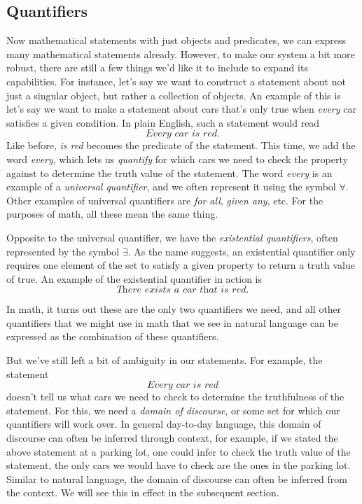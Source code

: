 \subsection{Quantifiers}
Now mathematical statements with just objects and predicates, we can express many mathematical statements already.
However, to make our system a bit more robust, there are still a few things we'd like it to include to expand its capabilities.
For instance, let's say we want to construct a statement about not just a singular object, but rather a collection of objects.
An example of this is let's say we want to make a statement about cars that's only true when \textit{every} car satisfies a given condition.
In plain English, such a statement would read
$$\textit{Every car is red.}$$
Like before, \textit{is red} becomes the predicate of the statement.
This time, we add the word \textit{every}, which lets us \textit{quantify} for which cars we need to check the property against to determine the truth value of the statement.
The word \textit{every} is an example of a \textit{universal quantifier}, and we often represent it using the symbol $\forall$.
Other examples of universal quantifiers are \textit{for all}, \textit{given any}, etc.
For the purposes of math, all these mean the same thing.

Opposite to the universal quantifier, we have the \textit{existential quantifiers}, often represented by the symbol $\exists$.
As the name suggests, an existential quantifier only requires one element of the set to satisfy a given property to return a truth value of true.
An example of the existential quantifier in action is
$$\textit{There exists a car that is red.}$$

In math, it turns out these are the only two quantifiers we need, and all other quantifiers that we might use in math that we see in natural language can be expressed as the combination of these quantifiers.

But we've still left a bit of ambiguity in our statements.
For example, the statement
$$\textit{Every car is red}$$
doesn't tell us what cars we need to check to determine the truthfulness of the statement.
For this, we need a \textit{domain of discourse}, or some set for which our quantifiers will work over.
In general day-to-day language, this domain of discourse can often be inferred through context, for example, if we stated the above statement at a parking lot, one could infer to check the truth value of the statement, the only cars we would have to check are the ones in the parking lot.
Similar to natural language, the domain of discourse can often be inferred from the context.
We will see this in effect in the subsequent section.

